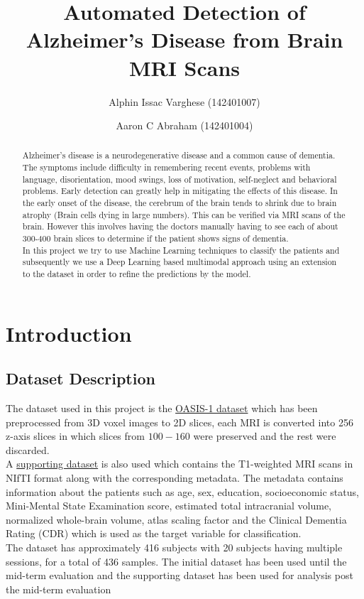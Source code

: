 \documentclass[10pt,twocolumn]{article}
\title{Automated Detection of Alzheimer's Disease from Brain MRI Scans}
\author{Alphin Issac Varghese (142401007) \and Aaron C Abraham (142401004)}
\date{}
\begin{document}
\maketitle

\begin{abstract}
    Alzheimer’s disease is a neurodegenerative disease and a common cause of dementia. The symptoms include difficulty in remembering recent events, problems with language, disorientation, mood swings, loss of motivation, self-neglect and behavioral problems.
    Early detection can greatly help in mitigating the effects of this disease. In the early onset of the disease, the cerebrum of the brain tends to shrink due to brain atrophy (Brain cells dying in large numbers). This can be verified via MRI scans of the brain. However this involves having the doctors manually having to see each of about 300-400 brain slices to determine if the patient shows signs of dementia. \\
    In this project we try to use Machine Learning techniques to classify the patients and subsequently we use a Deep Learning based multimodal approach using an extension to the dataset in order to refine the predictions by the model.
\end{abstract}

\section{Introduction}
    \subsection{Dataset Description}
        The dataset used in this project is the \href{https://www.kaggle.com/datasets/ninadaithal/imagesoasis}{OASIS-1 dataset} which has been preprocessed from 3D voxel images to 2D slices, each MRI is converted into 256 z-axis slices in which slices from $100 - 160$ were preserved and the rest were discarded. \\
        A \href{https://www.kaggle.com/datasets/ninadaithal/oasis-1-shinohara/}{supporting dataset} is also used which contains the T1-weighted MRI scans in NIfTI format along with the corresponding metadata. The metadata contains information about the patients such as age, sex, education, socioeconomic status, Mini-Mental State Examination score, estimated total intracranial volume, normalized whole-brain volume, atlas scaling factor and the Clinical Dementia Rating (CDR) which is used as the target variable for classification. \\
        The dataset has approximately 416 subjects with 20 subjects having multiple sessions, for a total of 436 samples. The initial dataset has been used until the mid-term evaluation and the supporting dataset has been used for analysis post the mid-term evaluation
\end{document}
